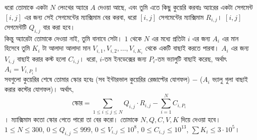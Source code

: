 \begin{example}
  ধরো তোমাকে একটা $N$ লেংথের অ্যারে $A$ দেওয়া আছে, এবং তুমি এতে কিছু কুয়েরি
  করবাঃ অ্যারের একটা সেগমেন্ট $[i, j]$ এর জন্য সেই সেগমেন্টের ম্যাক্সিমাম বের
  করবা, ধরো $[i, j]$ সেগমেন্টের ম্যাক্সিমাম $R_{i,j}$। $[i, j]$ সেগমেন্টটি
  $Q_{i, j}$ বার করা হবে।\\
  কিন্তু অ্যারেটা তোমাকে দেওয়া নাই, তুমি বানাবে সেটা। $1$ থেকে $N$ এর মধ্যে
  প্রতিটা $i$ এর জন্য $A_i$ এর মান হিসেবে তুমি $K_i$ টা আলাদা আলাদা মান
  $V_{i,1}, V_{i,2}, \ldots, V_{i, K_i}$ থেকে একটি বাছাই করতে পারবা। $A_i$ এর
  জন্য $V_{i, j}$ বাছাই করার কস্ট হলো $C_{i, j}$। ধরো, $i$-তম ইনডেক্সের জন্য
  $P_i$-তম ভ্যালুটি বাছাই করেছ, অর্থাৎ $A_i = V_{i,P_i}$।\\
  সবগুলো কুয়েরির শেষে তোমার স্কোর হবেঃ (সব ইন্টারভাল কুয়েরির রেজাল্টের যোগফল)
  $-$ ($A_i$ ভ্যালু গুলা বাছাই করার কস্টের যোগফল)। অর্থাৎ,
  \[
    \text{স্কোর} = \sum_{1 \le i \le j \le N} Q_{i,j} \cdot R_{i,j} - \sum_{i
    = 1}^{N} C_{i,P_i}
  \]। ম্যাক্সিমাম কতো স্কোর পেতে পারো তা বের করো। তোমাকে $N, Q, C, V, K$ দিয়ে
  দেওয়া হবে। $1 \le N \le 300$, $0 \le Q_{i,j} \le 999$, $0 \leq V_{i, j}
  \leq 10^8$, $0 \leq C_{i, j} \leq 10^{13}$, $\sum K_i \le 3\cdot 10^5$।
\end{example}
